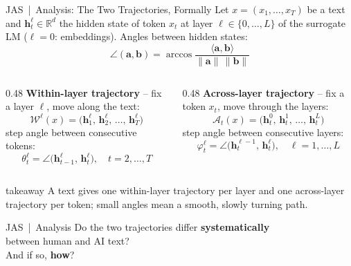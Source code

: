\documentclass[aspectratio=169,xcolor=table]{beamer}
\newenvironment{takeaway}{%
  \begin{beamercolorbox}[rounded=true, shadow=true, wd=\linewidth, sep=5pt]{takeaway}\small\ignorespaces}%
  {\end{beamercolorbox}}
\begin{document}
\begin{frame}{JAS \,|\, Analysis: The Two Trajectories, Formally}
  \small
  Let $x=(x_1,\dots,x_T)$ be a text and $\mathbf h_t^{\ell}\in\mathbb R^d$ the hidden state of token $x_t$ at layer
  $\ell\in\{0,\dots,L\}$ of the surrogate LM ($\ell=0$: embeddings). Angles between hidden states:
  \[
    \angle(\mathbf a,\mathbf b)=\arccos\frac{\langle\mathbf a,\mathbf b\rangle}{\lVert\mathbf a\rVert\,\lVert\mathbf b\rVert}
  \]
  \vspace{-4pt}
  \begin{columns}[T]
    \begin{column}{0.48\textwidth}
      \textcolor{mainblue}{\textbf{Within-layer trajectory}} -- fix a layer $\ell$, move along the text:
      \[
        \mathcal W^{\ell}(x)=\big(\mathbf h_1^{\ell},\,\mathbf h_2^{\ell},\,\dots,\,\mathbf h_T^{\ell}\big)
      \]
      step angle between consecutive tokens:
      \[
        \theta_t^{\ell}=\angle\big(\mathbf h_{t-1}^{\ell},\,\mathbf h_t^{\ell}\big),\quad t=2,\dots,T
      \]
    \end{column}
    \begin{column}{0.48\textwidth}
      \textcolor{machine!80!black}{\textbf{Across-layer trajectory}} -- fix a token $x_t$, move through the layers:
      \[
        \mathcal A_t(x)=\big(\mathbf h_t^{0},\,\mathbf h_t^{1},\,\dots,\,\mathbf h_t^{L}\big)
      \]
      step angle between consecutive layers:
      \[
        \varphi_t^{\ell}=\angle\big(\mathbf h_t^{\ell-1},\,\mathbf h_t^{\ell}\big),\quad \ell=1,\dots,L
      \]
    \end{column}
  \end{columns}
  \vspace{2pt}
  \begin{takeaway}
    A text gives one within-layer trajectory per layer and one across-layer trajectory per token; small angles mean
    a smooth, slowly turning path.
  \end{takeaway}
\end{frame}

\begin{frame}{JAS \,|\, Analysis}
  \vfill
  \centering
  {\Large Do the two trajectories differ \textbf{systematically}\\[4pt] between human and AI text?\\[10pt]
  And if so, \textbf{how}?}
  \vfill
\end{frame}
\end{document}
